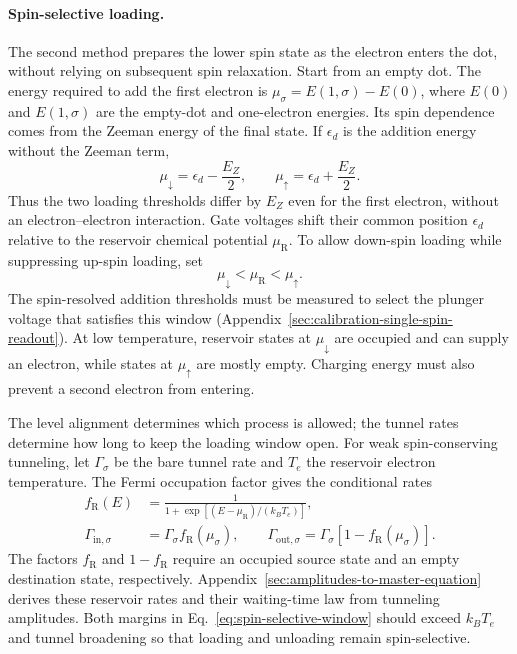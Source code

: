 \paragraph{Spin-selective loading.}
The second method prepares the lower spin state as the electron
enters the dot, without relying on subsequent spin relaxation.
Start from an empty dot. The energy required to add the first
electron is $\mu_\sigma=E(1,\sigma)-E(0)$, where $E(0)$ and
$E(1,\sigma)$ are the empty-dot and one-electron energies.
Its spin dependence comes from the Zeeman energy of the final state.
If $\epsilon_d$ is the addition energy without the Zeeman term,
\begin{equation}
  \mu_\downarrow=\epsilon_d-\frac{E_Z}{2},\qquad
  \mu_\uparrow=\epsilon_d+\frac{E_Z}{2}.
  \label{eq:spin-resolved-addition-energies}
\end{equation}
Thus the two loading thresholds differ by $E_Z$ even for the first
electron, without an electron--electron interaction.
Gate voltages shift their common position $\epsilon_d$ relative to
the reservoir chemical potential $\mu_{\mathrm R}$.
To allow down-spin loading while suppressing up-spin loading, set
\begin{equation}
  \mu_\downarrow<\mu_{\mathrm R}<\mu_\uparrow.
  \label{eq:spin-selective-window}
\end{equation}
The spin-resolved addition thresholds must be measured to select
the plunger voltage that satisfies this window
(Appendix~\ref{sec:calibration-single-spin-readout}).
At low temperature, reservoir states at $\mu_\downarrow$ are
occupied and can supply an electron, while states at
$\mu_\uparrow$ are mostly empty. Charging energy must also prevent
a second electron from entering.

The level alignment determines which process is allowed; the tunnel
rates determine how long to keep the loading window open.
For weak spin-conserving tunneling, let $\Gamma_\sigma$ be the bare
tunnel rate and $T_e$ the reservoir electron temperature.
The Fermi occupation factor gives the conditional rates
\begin{equation}
  \begin{aligned}
    f_{\mathrm R}(E)&=\frac{1}{1+\exp[(E-\mu_{\mathrm R})/(k_BT_e)]},\\
    \Gamma_{\mathrm{in},\sigma}&=\Gamma_\sigma f_{\mathrm R}(\mu_\sigma),
    \qquad
    \Gamma_{\mathrm{out},\sigma}
       =\Gamma_\sigma[1-f_{\mathrm R}(\mu_\sigma)].
  \end{aligned}
  \label{eq:reservoir-spin-rates}
\end{equation}
The factors $f_{\mathrm R}$ and $1-f_{\mathrm R}$ require an
occupied source state and an empty destination state, respectively.
Appendix~\ref{sec:amplitudes-to-master-equation} derives these
reservoir rates and their waiting-time law from tunneling amplitudes.
Both margins in Eq.~\eqref{eq:spin-selective-window} should exceed
$k_BT_e$ and tunnel broadening so that loading and unloading remain
spin-selective.

